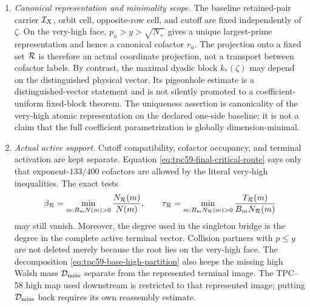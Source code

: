 \begin{enumerate}[label=\textup{(A\arabic*)},leftmargin=3.2em]
 \item \emph{Canonical representation and minimality scope.}
       The baseline retained-pair carrier \(\mathcal I_X\), orbit cell, opposite-row
       cell, and cutoff are fixed independently of \(\zeta\).  On the
       very-high face, \(p_u>y>\sqrt{N_+}\) gives a unique largest-prime
       representation and hence a canonical cofactor \(r_u\).  The
       projection onto a fixed set \(\mathcal R\) is therefore an actual coordinate
       projection, not a transport between cofactor labels.  By contrast,
       the maximal dyadic block \(k_*(\zeta)\) may depend on the distinguished
       physical vector.  Its pigeonhole estimate is a distinguished-vector
       statement and is not silently promoted to a coefficient-uniform
       fixed-block theorem.  The uniqueness assertion is canonicality of the
       very-high atomic representation on the declared one-side baseline; it
       is not a claim that the full coefficient parametrization is globally
       dimension-minimal.

 \item \emph{Actual active support.}
       Cutoff compatibility, cofactor occupancy, and terminal activation are
       kept separate.  Equation \eqref{eq:tpc59-final-critical-route} says
       only that exponent-\(133/400\) cofactors are allowed by the literal
       very-high inequalities.  The exact tests
       \begin{equation}
        \beta_{\mathcal R}
        =\min_{m:B_mN(m)>0}\frac{N_{\mathcal R}(m)}{N(m)},
        \qquad
        \tau_{\mathcal R}
        =\min_{m:B_mN_{\mathcal R}(m)>0}
          \frac{T_{\mathcal R}(m)}{B_mN_{\mathcal R}(m)}
        \label{eq:tpc59-audit-active-support-tests}
       \end{equation}
       may still vanish.  Moreover, the degree used in the singleton bridge
       is the degree in the complete active terminal vector.  Collision
       partners with \(p\le y\) are not deleted merely because the root lies
       on the very-high face.  The decomposition
       \eqref{eq:tpc59-base-high-partition} also keeps the missing high Walsh
       mass \(\mathcal D_{\rm miss}\) separate from the represented terminal image.
       The TPC--58 high map used downstream is restricted to that represented
       image; putting \(\mathcal D_{\rm miss}\) back requires its own reassembly
       estimate.


\end{enumerate}
